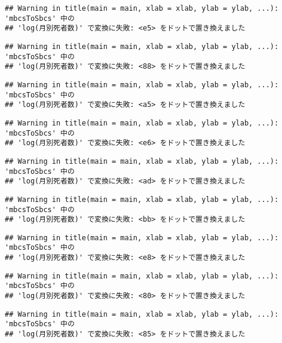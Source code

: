 \documentclass[]{article}
\begin{document}
\begin{verbatim}
## Warning in title(main = main, xlab = xlab, ylab = ylab, ...): 'mbcsToSbcs' 中の
## 'log(月別死者数)' で変換に失敗: <e5> をドットで置き換えました
\end{verbatim}

\begin{verbatim}
## Warning in title(main = main, xlab = xlab, ylab = ylab, ...): 'mbcsToSbcs' 中の
## 'log(月別死者数)' で変換に失敗: <88> をドットで置き換えました
\end{verbatim}

\begin{verbatim}
## Warning in title(main = main, xlab = xlab, ylab = ylab, ...): 'mbcsToSbcs' 中の
## 'log(月別死者数)' で変換に失敗: <a5> をドットで置き換えました
\end{verbatim}

\begin{verbatim}
## Warning in title(main = main, xlab = xlab, ylab = ylab, ...): 'mbcsToSbcs' 中の
## 'log(月別死者数)' で変換に失敗: <e6> をドットで置き換えました
\end{verbatim}

\begin{verbatim}
## Warning in title(main = main, xlab = xlab, ylab = ylab, ...): 'mbcsToSbcs' 中の
## 'log(月別死者数)' で変換に失敗: <ad> をドットで置き換えました
\end{verbatim}

\begin{verbatim}
## Warning in title(main = main, xlab = xlab, ylab = ylab, ...): 'mbcsToSbcs' 中の
## 'log(月別死者数)' で変換に失敗: <bb> をドットで置き換えました
\end{verbatim}

\begin{verbatim}
## Warning in title(main = main, xlab = xlab, ylab = ylab, ...): 'mbcsToSbcs' 中の
## 'log(月別死者数)' で変換に失敗: <e8> をドットで置き換えました
\end{verbatim}

\begin{verbatim}
## Warning in title(main = main, xlab = xlab, ylab = ylab, ...): 'mbcsToSbcs' 中の
## 'log(月別死者数)' で変換に失敗: <80> をドットで置き換えました
\end{verbatim}

\begin{verbatim}
## Warning in title(main = main, xlab = xlab, ylab = ylab, ...): 'mbcsToSbcs' 中の
## 'log(月別死者数)' で変換に失敗: <85> をドットで置き換えました
\end{verbatim}
\end{document}
